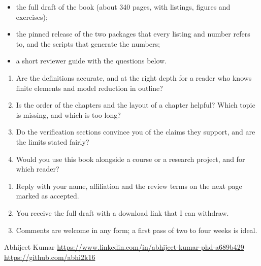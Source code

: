 \newpage\thispagestyle{hl}
\begin{itemize}\setlength\itemsep{3pt}
\item the full draft of the book (about 340 pages, with listings, figures and exercises);
\item the pinned release of the two packages that every listing and number refers to, and the scripts that generate the numbers;
\item a short reviewer guide with the questions below.
\end{itemize}
\begin{enumerate}\setlength\itemsep{3pt}
\item Are the definitions accurate, and at the right depth for a reader who knows finite elements and model reduction in outline?
\item Is the order of the chapters and the layout of a chapter helpful? Which topic is missing, and which is too long?
\item Do the verification sections convince you of the claims they support, and are the limits stated fairly?
\item Would you use this book alongside a course or a research project, and for which reader?
\end{enumerate}
\begin{enumerate}\setlength\itemsep{3pt}
\item Reply with your name, affiliation and the review terms on the next page marked as accepted.
\item You receive the full draft with a download link that I can withdraw.
\item Comments are welcome in any form; a first pass of two to four weeks is ideal.
\end{enumerate}
Abhijeet Kumar \quad \url{https://www.linkedin.com/in/abhijeet-kumar-phd-a689b429} \quad \url{https://github.com/abhi2k16} 

